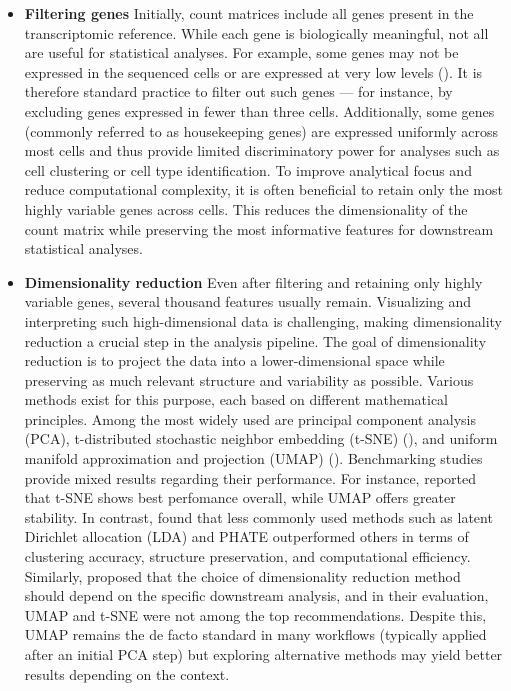 \begin{itemize}
  \item \textbf{Filtering genes}
Initially, count matrices include all genes present in the transcriptomic reference.
While each gene is biologically meaningful, not all are useful for statistical analyses.
For example, some genes may not be expressed in the sequenced cells or are expressed at very low levels (\cite{Heumos2023}).
It is therefore standard practice to filter out such genes —
for instance, by excluding genes expressed in fewer than three cells.
Additionally, some genes (commonly referred to as housekeeping genes) are expressed uniformly across most cells
and thus provide limited discriminatory power for analyses such as cell clustering or cell type identification.
To improve analytical focus and reduce computational complexity,
it is often beneficial to retain only the most highly variable genes across cells.
This reduces the dimensionality of the count matrix while preserving the most informative features
for downstream statistical analyses.

  \item \textbf{Dimensionality reduction}
Even after filtering and retaining only highly variable genes, several thousand features usually remain.
Visualizing and interpreting such high-dimensional data is challenging,
making dimensionality reduction a crucial step in the analysis pipeline.
The goal of dimensionality reduction is to project the data into a lower-dimensional space while preserving
as much relevant structure and variability as possible.
Various methods exist for this purpose, each based on different mathematical principles.
Among the most widely used are principal component analysis (PCA), t-distributed stochastic neighbor embedding (t-SNE)
(\cite{Hinton2002}), and uniform manifold approximation and projection (UMAP) (\cite{McInnes2018}).
Benchmarking studies provide mixed results regarding their performance.
For instance, \textcite{Xiang2021} reported that t-SNE shows best perfomance overall, while UMAP offers greater stability.
In contrast, \textcite{Koch2021} found that less commonly used methods such as latent Dirichlet allocation (LDA)
and PHATE outperformed others in terms of clustering accuracy, structure preservation, and computational efficiency.
Similarly, \textcite{Sun2019} proposed that the choice of dimensionality reduction method should depend
on the specific downstream analysis, and in their evaluation, UMAP and t-SNE were not among the top recommendations.
Despite this, UMAP remains the de facto standard in many workflows (typically applied after an initial PCA step) but
exploring alternative methods may yield better results depending on the context.


\end{itemize}
